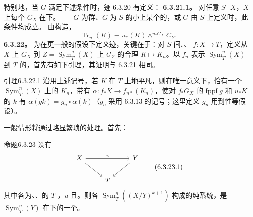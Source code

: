特别地，当 $G$ 满足下述条件时，迹 6.3.20 有定义：
\textbf{6.3.21.1。} 对任意 $S$- $X$，$X$ 上每个 $G_X$-在下。——$G$ 为群、$G$ 为 $S$ 的小上某个的，或 $G$ 由 $S$ 上定义时，此条件均成立。
由构造，
\[\operatorname{Tr}_u(K)=u_*(K)\mathbin{\wedge}^{u_*G_X}G_Y.\tag{6.3.21.2}\]
\textbf{6.3.22。} 为在更一般的假设下定义迹，关键在于：对 $S$-间、、 $f:X\to T$，定义从 $X$ 上 $G_X$-到 $Z=\operatorname{Sym}_T^n(X)$ 上 $G_Z$-的合理 $K\mapsto K_n$。以 $f_n$ 表示 $\operatorname{Sym}_T^n(X)$ 到 $T$ 的，首先有如下引理，其证明与 6.3.21 相同。
\begin{SGAresult}{引理}{6.3.22.1}
沿用上述记号，若 $K$ 在 $T$ 上地平凡，则在唯一意义下，恰有一个 $\operatorname{Sym}_T^n(X)$ 上的 $K_n$，带有 $\alpha:f_*K\to f_{n*}(K_n)$，使对 $f_*G_X$ 的 fppf  $g$ 和 $u_*K$ 的 $k$ 有 $\alpha(gk)=g_n\circ\alpha(k)$（$g_n$ 采用 6.3.13 的记号；这里定义 $g_n$ 用到性等假设）。
\end{SGAresult}
一般情形将通过略显繁琐的处理。首先：
\begin{SGAresult}{命题}{6.3.23}
设有
\[\begin{tikzcd}X\arrow[rr,"u"]\arrow[dr]&&Y\arrow[dl]\\&T&\end{tikzcd}\tag{6.3.23.1}\]
其中各为、、的 $T$-，$u$ 且。则各 $\operatorname{Sym}_T^n((X/Y)^{k+1})$ 构成的纯系统，是 $\operatorname{Sym}_T^n(Y)$ 在下的一个。
\end{SGAresult}
